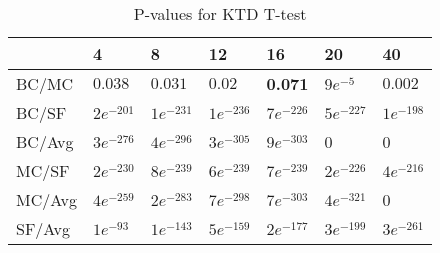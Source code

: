 \begin{table}[H]
	\centering
	\begin{tabular}{|l|llllll|}\hline
		& 4 & 8 & 12 & 16 & 20 & 40 \\\hline
		BC/MC	& $0.038$	& $0.031$	& $0.02$	& \textbf{0.071}	& $9e^{-5}$	& $0.002$ \\
		BC/SF	& $2e^{-201}$	& $1e^{-231}$	& $1e^{-236}$	& $7e^{-226}$ & $5e^{-227}$ & $1e^{-198}$ \\
		BC/Avg	& $3e^{-276}$	& $4e^{-296}$ 	& $3e^{-305}$	& $9e^{-303}$	& 0 & 0 \\
		MC/SF	& $2e^{-230}$	& $8e^{-239}$ 	& $6e^{-239}$	& $7e^{-239}$	& $2e^{-226}$ & $4e^{-216}$ \\
		MC/Avg	& $4e^{-259}$	& $2e^{-283}$ 	& $7e^{-298}$	& $7e^{-303}$ & $4e^{-321}$ & 0 \\
		SF/Avg	& $1e^{-93}$	& $1e^{-143}$ 	& $5e^{-159}$	& $2e^{-177}$	& $3e^{-199}$ & $3e^{-261}$ \\ \hline
	\end{tabular}
	\caption{P-values for KTD T-test}
	\label{tbl:ktd_ttest}
\end{table}